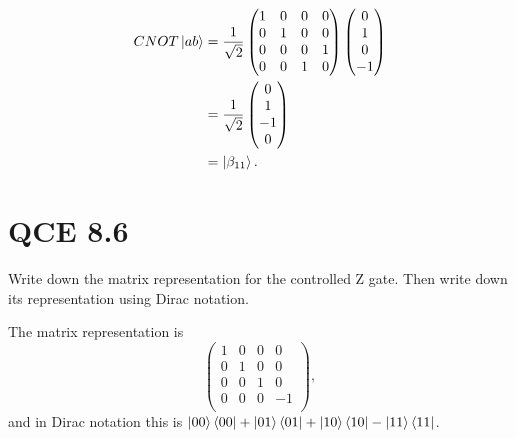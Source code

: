 \documentclass[10pt]{article}
\begin{document}
\begin{align*}
CNOT \ket{ab} &= 
\frac{1}{\sqrt{2}}
\begin{pmatrix}
1 & 0 & 0 & 0 \\
0 & 1 & 0 & 0 \\
0 & 0 & 0 & 1 \\
0 & 0 & 1 & 0
\end{pmatrix}
\begin{pmatrix}
0 \\
1 \\
0 \\
-1
\end{pmatrix} \\
&= \frac{1}{\sqrt{2}}
\begin{pmatrix}
0 \\
1 \\
-1 \\
0
\end{pmatrix} \\
&= \ket{\beta_{11}}.
\end{align*}

\section*{QCE 8.6}
Write down the matrix representation for the controlled Z gate. Then write down its representation using Dirac notation.

The matrix representation is
\[
\begin{pmatrix}
1 & 0 & 0 & 0 \\
0 & 1 & 0 & 0 \\
0 & 0 & 1 & 0 \\
0 & 0 & 0 & -1 \\
\end{pmatrix},
\]
and in Dirac notation this is $\ket{00} \bra{00} + \ket{01} \bra{01}  + \ket{10} \bra{10} - \ket{11} \bra{11}$.
\end{document}
